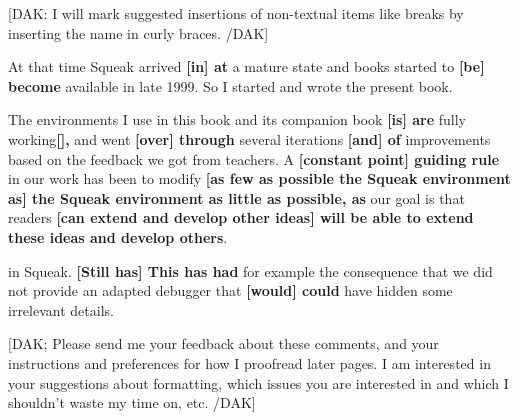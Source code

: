 \documentclass[12pt,a4paper]{article}
\begin{document}
[DAK: I will mark suggested insertions of non-textual items like breaks by inserting the name in curly braces. /DAK]





At that time Squeak arrived\textbf{ [in] at }a mature state and books started to\textbf{ [be] become }available in late 1999. So I started and wrote the present book. 





The environments I use in this book and its companion book\textbf{ [is] are }fully working\textbf{[], }and went\textbf{ [over] through }several iterations\textbf{ [and] of }improvements based on the feedback we got from teachers.  A\textbf{ [constant point] guiding rule }in our work has been to modify\textbf{ [as few as possible the Squeak environment as] the Squeak environment as little as possible, as }our goal is that readers \textbf{[can extend and develop other ideas] will be able to extend these ideas and develop others}.





\begin{flushleft}
in Squeak.  \textbf{[Still has] This has had }for example the consequence that we did not provide an adapted debugger that\textbf{ [would] could }have hidden some irrelevant details. 
\end{flushleft}


\begin{flushleft}

\end{flushleft}





[DAK; Please send me your feedback about these comments, and your instructions and preferences for how I proofread later pages.  I am interested in your suggestions about formatting, which issues you are interested in and which I shouldn't waste my time on, etc.  /DAK]


\begin{flushleft}

\end{flushleft}
\end{document}

